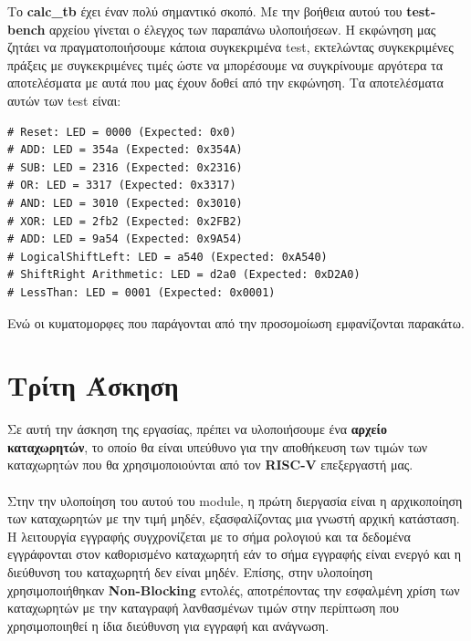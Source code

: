 \documentclass[a4paper,12pt]{report}
\def\tl{\textlatin}
\begin{document}
    \newpage
    Το \textbf{\tl{calc\_tb}} έχει έναν πολύ σημαντικό σκοπό. Με την βοήθεια αυτού του \textbf{\tl{testbench}} αρχείου γίνεται ο έλεγχος των παραπάνω υλοποιήσεων. Η εκφώνηση μας ζητάει να πραγματοποιήσουμε κάποια συγκεκριμένα \tl{test}, εκτελώντας συγκεκριμένες πράξεις με συγκεκριμένες τιμές ώστε να μπορέσουμε να συγκρίνουμε αργότερα τα αποτελέσματα με αυτά που μας έχουν δοθεί από την εκφώνηση. Τα αποτελέσματα αυτών των \tl{test} είναι:
    \vspace{0.5cm}
    \begin{lstlisting}[style=verilog]
# Reset: LED = 0000 (Expected: 0x0)
# ADD: LED = 354a (Expected: 0x354A)
# SUB: LED = 2316 (Expected: 0x2316)
# OR: LED = 3317 (Expected: 0x3317)
# AND: LED = 3010 (Expected: 0x3010)
# XOR: LED = 2fb2 (Expected: 0x2FB2)
# ADD: LED = 9a54 (Expected: 0x9A54)
# LogicalShiftLeft: LED = a540 (Expected: 0xA540)
# ShiftRight Arithmetic: LED = d2a0 (Expected: 0xD2A0)
# LessThan: LED = 0001 (Expected: 0x0001)
    \end{lstlisting}
    \vspace{0.5cm}
    Ενώ οι κυματομορφες που παράγονται από την προσομοίωση εμφανίζονται παρακάτω.
    \vspace{0.5cm}
    \begin{figure}[h!]
        \centering
        \caption{}
    \end{figure}
\chapter{Τρίτη Άσκηση}
    \large Σε αυτή την άσκηση της εργασίας, πρέπει να υλοποιήσουμε ένα \textbf{αρχείο καταχωρητών}, το οποίο θα είναι υπεύθυνο για την αποθήκευση των τιμών των καταχωρητών που θα χρησιμοποιούνται από τον \textbf{\tl{RISC-V}} επεξεργαστή μας.\\ \\
    Στην την υλοποίηση του αυτού του \tl{module}, η πρώτη διεργασία είναι η αρχικοποίηση των καταχωρητών με την τιμή μηδέν, εξασφαλίζοντας μια γνωστή αρχική κατάσταση. Η λειτουργία εγγραφής συγχρονίζεται με το σήμα ρολογιού και τα δεδομένα εγγράφονται στον καθορισμένο καταχωρητή εάν το σήμα εγγραφής είναι ενεργό και η διεύθυνση του καταχωρητή δεν είναι μηδέν. Επίσης, στην υλοποίηση χρησιμοποιήθηκαν \textbf{\tl{Non-Blocking}} εντολές, αποτρέποντας την εσφαλμένη χρίση των καταχωρητών με την καταγραφή λανθασμένων τιμών στην περίπτωση που χρησιμοποιηθεί η ίδια διεύθυνση για εγγραφή και ανάγνωση.
\end{document}
